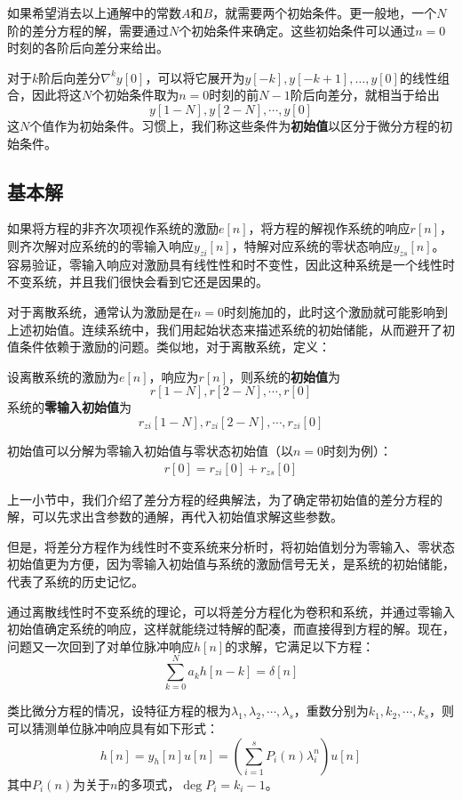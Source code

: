 如果希望消去以上通解中的常数$A$和$B$，就需要两个初始条件。更一般地，一个$N$阶的差分方程的解，需要通过$N$个初始条件来确定。这些初始条件可以通过$n=0$时刻的各阶后向差分来给出。

对于$k$阶后向差分$\nabla^k y[0]$，可以将它展开为$y[-k],y[-k+1],\dots,y[0]$的线性组合，因此将这$N$个初始条件取为$n=0$时刻的前$N-1$阶后向差分，就相当于给出
$$y[1-N],y[2-N],\cdots,y[0]$$
这$N$个值作为初始条件。习惯上，我们称这些条件为\textbf{初始值}以区分于微分方程的初始条件。

\subsection{基本解}\label{sub:h_solution}

如果将方程的非齐次项视作系统的激励$e[n]$，将方程的解视作系统的响应$r[n]$，则齐次解对应系统的的零输入响应$y_{zi}[n]$，特解对应系统的零状态响应$y_{zs}[n]$。容易验证，零输入响应对激励具有线性性和时不变性，因此这种系统是一个线性时不变系统，并且我们很快会看到它还是因果的。

对于离散系统，通常认为激励是在$n=0$时刻施加的，此时这个激励就可能影响到上述初始值。连续系统中，我们用起始状态来描述系统的初始储能，从而避开了初值条件依赖于激励的问题。类似地，对于离散系统，定义：
\begin{definition}[离散系统的初始值与零输入初始值]
    设离散系统的激励为$e[n]$，响应为$r[n]$，则系统的\textbf{初始值}为
    $$r[1-N],r[2-N],\cdots,r[0]$$
    系统的\textbf{零输入初始值}为
    $$r_{zi}[1-N],r_{zi}[2-N],\cdots,r_{zi}[0]$$
\end{definition}

初始值可以分解为零输入初始值与零状态初始值（以$n=0$时刻为例）：
\begin{align*}
    r[0]=r_{zi}[0]+r_{zs}[0]
\end{align*}

上一小节中，我们介绍了差分方程的经典解法，为了确定带初始值的差分方程的解，可以先求出含参数的通解，再代入初始值求解这些参数。

但是，将差分方程作为线性时不变系统来分析时，将初始值划分为零输入、零状态初始值更为方便，因为零输入初始值与系统的激励信号无关，是系统的初始储能，代表了系统的历史记忆。

通过离散线性时不变系统的理论，可以将差分方程化为卷积和系统，并通过零输入初始值确定系统的响应，这样就能绕过特解的配凑，而直接得到方程的解。现在，问题又一次回到了对单位脉冲响应$h[n]$的求解，它满足以下方程：
$$\sum_{k=0}^{N}a_k h[n-k] = \delta[n]$$

类比微分方程的情况，设特征方程的根为$\lambda_1,\lambda_2,\cdots,\lambda_s$，重数分别为$k_1,k_2,\cdots,k_s$，则可以猜测单位脉冲响应具有如下形式：
$$h[n]=y_h[n]u[n]=\left(\sum_{i=1}^s P_i(n) \lambda_i^n \right)u[n]$$
其中$P_i(n)$为关于$n$的多项式，$\deg P_i=k_i-1$。

